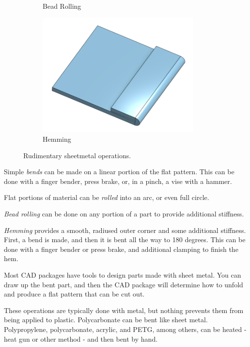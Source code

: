 \begin{figure}[H]
\begin{subfigure}[b]{.24\linewidth}
			\caption{Bead Rolling}
		\end{subfigure}\begin{subfigure}[b]{.24\linewidth}
			\includegraphics[width=0.9\textwidth]{imgs/sheet_hem.png}
			\caption{Hemming}
		\end{subfigure}
		\caption{Rudimentary sheetmetal operations.}
	\end{figure} 
 
 \begin{asparaenum}[a)]
 	\item Simple \textit{bends} can be made on a linear portion of the flat pattern. This can be done with a finger bender, press brake, or, in a pinch, a vise with a hammer.
 	\item Flat portions of material can be \textit{rolled} into an arc, or even full circle.
 	\item \textit{Bead rolling} can be done on any portion of a part to provide additional stiffness.	
 	\item \textit{Hemming} provides a smooth, radiused outer corner and some additional stiffness. First, a bend is made, and then it is bent all the way to 180 degrees. This can be done with a finger bender or press brake, and additional clamping to finish the hem.
 	\end{asparaenum}
 	
 	Most CAD packages have tools to design parts made with sheet metal. You can draw up the bent part, and then the CAD package will determine how to unfold and produce a flat pattern that can be cut out.
 	
 	These operations are typically done with metal, but nothing prevents them from being applied to plastic. Polycarbonate can be bent like sheet metal. Polypropylene, polycarbonate, acrylic, and PETG, among others, can be heated - heat gun or other method - and then bent by hand.
 	
